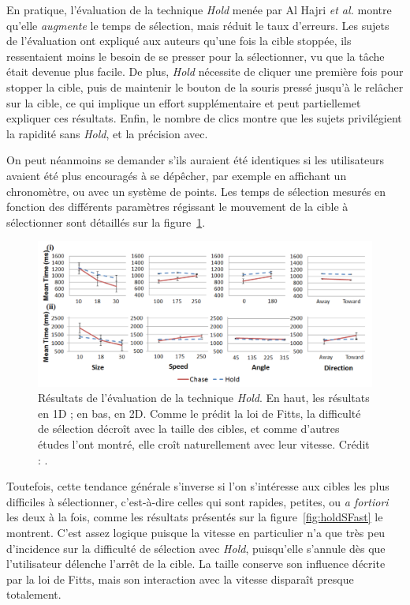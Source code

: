 	En pratique, l'évaluation de la technique \emph{Hold} menée par Al Hajri \emph{et al.} montre qu'elle \emph{augmente} le temps de sélection, mais réduit le taux d'erreurs. Les sujets de l'évaluation ont expliqué aux auteurs qu'une fois la cible stoppée, ils ressentaient moins le besoin de se presser pour la sélectionner, vu que la tâche était devenue plus facile. De plus, \emph{Hold} nécessite de cliquer une première fois pour stopper la cible, puis de maintenir le bouton de la souris pressé jusqu'à le relâcher sur la cible, ce qui implique un effort supplémentaire et peut partiellemet expliquer ces résultats. Enfin, le nombre de clics montre que les sujets privilégient la rapidité sans \emph{Hold}, et la précision avec.
	
	On peut néanmoins se demander s'ils auraient été identiques si les utilisateurs avaient été plus encouragés à se dépêcher, par exemple en affichant un chronomètre, ou avec un système de points. Les temps de sélection mesurés en fonction des différents paramètres régissant le mouvement de la cible à sélectionner sont détaillés sur la figure~\ref{fig:holdRes}.
	
	\begin{figure}[H]
		\centering
		\includegraphics[width=\textwidth]{figures/ch2/holdRes}
		\caption[\emph{Hold} --- évaluation]{Résultats de l'évaluation de la technique \emph{Hold}. En haut, les résultats en 1D ; en bas, en 2D. Comme le prédit la loi de Fitts, la difficulté de sélection décroît avec la taille des cibles, et comme d'autres études l'ont montré, elle croît naturellement avec leur vitesse.  Crédit : \cite{hajri2011moving}.}
		\label{fig:holdRes}
	\end{figure}
	
	Toutefois, cette tendance générale s'inverse si l'on s'intéresse aux cibles les plus difficiles à sélectionner, c'est-à-dire celles qui sont rapides, petites, ou \emph{a fortiori} les deux à la fois, comme les résultats présentés sur la figure~\ref{fig:holdSFast} le montrent. C'est assez logique puisque la vitesse en particulier n'a que très peu d'incidence sur la difficulté de sélection avec \emph{Hold}, puisqu'elle s'annule dès que l'utilisateur délenche l'arrêt de la cible. La taille conserve son influence décrite par la loi de Fitts, mais son interaction avec la vitesse disparaît presque totalement.
	
